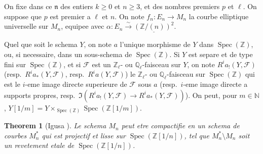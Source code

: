 \documentclass[11pt,reqno]{amsart}
\theoremstyle{plain}
\newtheorem{theorem}{Theorem}[section]
\theoremstyle{remark}
\DeclareMathOperator{\Spec}{Spec}
\newcommand{\shF}{\mathcal{F}}
\newcommand{\Z}{\mathbb{Z}}
\newcommand{\Q}{\mathbb{Q}}
\newcommand{\N}{\mathbb{N}}
\newcommand{\isom}{\xrightarrow{\sim}}
\numberwithin{equation}{section}
\begin{document}
On fixe dans ce $\mathfrak{n}$ des entiers $k \geq 0$ et $n \geq 3$, et des nombres premiers $p$ et $\ell$. On suppose que $p$ est premier a $\ell$ et $n$. On note $f_n: E_n \to M_n$ la courbe elliptique universelle sur $M_n$, equipee avec $\alpha: E_n \isom \underline{(\Z/(n))^2}$.

Quel que soit le schema $Y$, on note $a$ l'unique morphisme de $Y$ dans $\Spec(\Z)$, ou, si necessaire, dans un sous-schema de $\Spec(\Z)$. Si $Y$ est separe et de type fini sur $\Spec(\Z)$, et si $\shF$ est un $\Z_\ell$- ou $\Q_\ell$-faisceau sur $Y$, on note $R^i a_!(Y, \shF)$ (resp.~$R^i a_*(Y, \shF)$, resp.~$R^i a(Y, \shF)$) le $\Z_\ell$- ou $\Q_\ell$-faisceau sur $\Spec(\Z)$ qui est le $i$-eme image directe superieure de $\shF$ sous $a$ (resp.~$i$-eme image directe a supports propres, resp.~$\Im(R^i a_!(Y, \shF) \to R^i a_*(Y, \shF))$). On peut, pour $m \in \N$, $Y[1/m] = Y \times_{\Spec(\Z)} \Spec(\Z[1/m])$.

\begin{theorem}[Igusa \cite{Igusa}]\label{thm:igusa}
Le schema $M_n$ peut etre compactifie en un schema de courbes $M_n^*$ qui est projectif et lisse sur $\Spec(\Z[1/n])$, tel que $M_n^* \setminus M_n$ soit un revetement etale de $\Spec(\Z[1/n])$.
\end{theorem}
\end{document}

